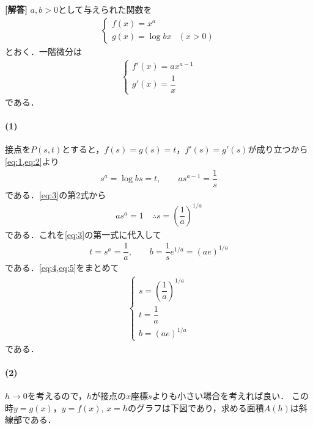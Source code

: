 \documentclass[../../main.tex]{subfiles}
\begin{document}
\begin{oframed}
  
\end{oframed}

{\bf [解答]}
$a,b>0$として与えられた関数を
\begin{align}
  \begin{cases}
    f(x)=x^a \\
    g(x)=\log bx & (x>0)
  \end{cases} \label{eq:1}
\end{align}
とおく．一階微分は
\begin{align}
  \begin{cases}
    f'(x)=ax^{a-1} \\
    g'(x)=\dfrac{1}{x}
  \end{cases} \label{eq:2}
\end{align}
である．

\paragraph{(1)}
接点を$P(s,t)$とすると，$f(s)=g(s)=t$，$f'(s)=g'(s)$が成り立つから\cref{eq:1,eq:2}より
\begin{align}
  s^a=\log bs=t,\qquad as^{a-1}=\dfrac{1}{s} \label{eq:3}
\end{align}
である．\cref{eq:3}の第2式から
\begin{align}
  as^a=1 \quad \therefore s = \left(\dfrac{1}{a}\right)^{1/a} \label{eq:4}
\end{align}
である．これを\cref{eq:3}の第一式に代入して
\begin{align}
  t=s^a=\dfrac{1}{a},\qquad b=\dfrac{1}{s}e^{1/a}=(ae)^{1/a} \label{eq:5}
\end{align}
である．\cref{eq:4,eq:5}をまとめて
\begin{align}
  \begin{cases}
    s = \left(\dfrac{1}{a}\right)^{1/a} \\
    t = \dfrac{1}{a} \\
    b = (ae)^{1/a}
  \end{cases} \label{eq:6}
\end{align}
である．

\paragraph{(2)}

$h\to 0$を考えるので，$h$が接点の$x$座標$s$よりも小さい場合を考えれば良い．
この時$y=g(x)$，$y=f(x)$, $x=h$のグラフは下図であり，求める面積$A(h)$は斜線部である．
\end{document}
